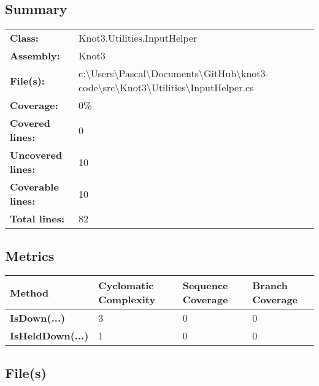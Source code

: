\documentclass[a4paper,10pt]{article}
\begin{document}
\subsection{Summary}
\begin{longtable}[l]{ll}
\textbf{Class:} & Knot3.Utilities.InputHelper\\
\textbf{Assembly:} & Knot3\\
\textbf{File(s):} & \begin{minipage}[t]{12cm}{c:\textbackslash Users\textbackslash Pascal\textbackslash Documents\textbackslash GitHub\textbackslash knot3-code\textbackslash src\textbackslash Knot3\textbackslash Utilities\textbackslash InputHelper.cs}\end{minipage} \\
\textbf{Coverage:} & 0\%\\
\textbf{Covered lines:} & 0\\
\textbf{Uncovered lines:} & 10\\
\textbf{Coverable lines:} & 10\\
\textbf{Total lines:} & 82\\
\end{longtable}
\subsection{Metrics}
\begin{longtable}[l]{|l|l|l|l|}
\hline
\textbf{Method} & \textbf{Cyclomatic Complexity} & \textbf{Sequence Coverage} & \textbf{Branch Coverage}\\
\hline
\textbf{IsDown(...)} & 3 & 0 & 0\\
\hline
\textbf{IsHeldDown(...)} & 1 & 0 & 0\\
\hline
\end{longtable}
\subsection{File(s)}
\end{document}
